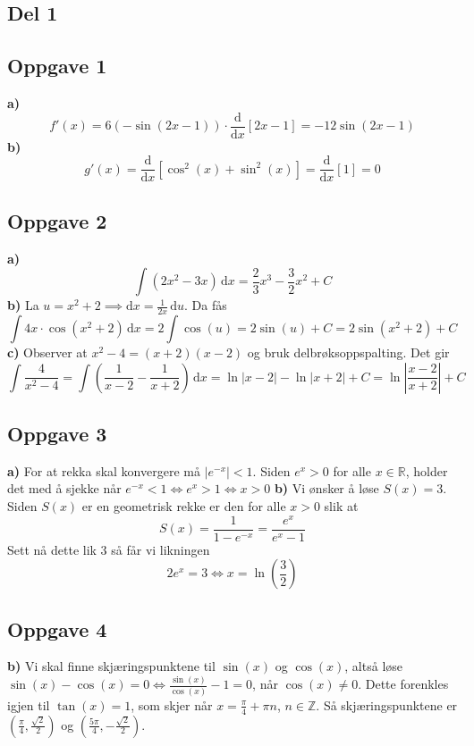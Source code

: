 \documentclass[12pt]{article}
\begin{document}
	\begin{flushleft}
		\section{Del 1}
		\subsection{Oppgave 1}
		\textbf{a)} $$f'(x)=6(-\sin(2x-1)) \cdot \frac{\text{d}}{\text{d}x}\left[2x-1\right]=-12\sin(2x-1)$$ 
		\textbf{b)} $$g'(x)=\frac{\text{d}}{\text{d}x}\left[\cos^2(x)+\sin^2(x) \right] = \frac{\text{d}}{\text{d}x}[1] = 0$$
		
		\subsection{Oppgave 2}
		\textbf{a)} $$ \int \left(2x^2-3x\right) \, \text{d}x = \frac23 x^3 - \frac32 x^2 + C$$ 
		\textbf{b)} La $u=x^2+2 \implies \text{d}x = \frac{1}{2x} \, \text{d}u$. Da fås $$\int 4x \cdot \cos(x^2+2) \, \text{d}x = 2\int \cos(u) = 2\sin(u) + C = 2\sin(x^2+2) + C$$
		\textbf{c)} Observer at $x^2-4=(x+2)(x-2)$ og bruk delbrøksoppspalting. Det gir $$\int \frac{4}{x^2-4} = \int \left(\frac{1}{x-2} - \frac{1}{x+2} \right) \, \text{d}x = \ln|x-2| - \ln|x+2| + C = \ln \left| \frac{x-2}{x+2}\right| + C$$
		
		\subsection{Oppgave 3}
		\textbf{a)} For at rekka skal konvergere må $|e^{-x}| < 1$. Siden $e^x>0$ for alle $x \in \mathbb{R}$, holder det med å sjekke når $e^{-x} < 1 \Longleftrightarrow e^x>1 \Longleftrightarrow x > 0$ \newline
		\textbf{b)} Vi ønsker å løse $S(x)=3$. Siden $S(x)$ er en geometrisk rekke er den for alle $x>0$ slik at $$S(x)=\frac{1}{1-e^{-x}}=\frac{e^x}{e^x-1}$$ Sett nå dette lik $3$ så får vi likningen $$ 2e^x=3 \Longleftrightarrow x = \ln\left(\frac32\right)$$
		
		\subsection{Oppgave 4}
		\textbf{b)} Vi skal finne skjæringspunktene til $\sin(x)$ og $\cos(x)$, altså løse $\sin(x)-\cos(x)=0 \Longleftrightarrow \frac{\sin(x)}{\cos(x)} - 1 = 0$, når $\cos(x)\neq 0$. Dette forenkles igjen til $\tan(x)=1$, som skjer når $x=\frac{\pi}{4} + \pi n$, $n \in \mathbb{Z}$. Så skjæringspunktene er $(\frac{\pi}{4}, \frac{\sqrt{2}}{2})$ og $(\frac{5\pi}{4}, -\frac{\sqrt{2}}{{2}})$. \newline
		

\end{flushleft}
\end{document}
